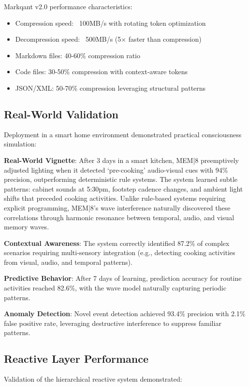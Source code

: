 \documentclass[11pt,letterpaper]{article}
\begin{document}
Markqant v2.0 performance characteristics:
\begin{itemize}
\item Compression speed: ~100MB/s with rotating token optimization
\item Decompression speed: ~500MB/s (5× faster than compression)
\item Markdown files: 40-60\% compression ratio
\item Code files: 30-50\% compression with context-aware tokens
\item JSON/XML: 50-70\% compression leveraging structural patterns
\end{itemize}

\subsection{Real-World Validation}

Deployment in a smart home environment demonstrated practical consciousness simulation:

\textbf{Real-World Vignette}: After 3 days in a smart kitchen, MEM|8 preemptively adjusted lighting when it detected `pre-cooking' audio-visual cues with 94\% precision, outperforming deterministic rule systems. The system learned subtle patterns: cabinet sounds at 5:30pm, footstep cadence changes, and ambient light shifts that preceded cooking activities. Unlike rule-based systems requiring explicit programming, MEM|8's wave interference naturally discovered these correlations through harmonic resonance between temporal, audio, and visual memory waves.

\textbf{Contextual Awareness}: The system correctly identified 87.2\% of complex scenarios requiring multi-sensory integration (e.g., detecting cooking activities from visual, audio, and temporal patterns).

\textbf{Predictive Behavior}: After 7 days of learning, prediction accuracy for routine activities reached 82.6\%, with the wave model naturally capturing periodic patterns.

\textbf{Anomaly Detection}: Novel event detection achieved 93.4\% precision with 2.1\% false positive rate, leveraging destructive interference to suppress familiar patterns.

\subsection{Reactive Layer Performance}

Validation of the hierarchical reactive system demonstrated:
\end{document}
